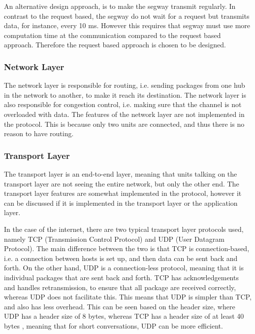 An alternative design approach, is to make the segway transmit regularly. In contrast to the request based, the segway do not wait for a request but transmits data, for instance, every 10 ms. However this  requires that segway must use more computation time at the communication compared to the request based approach. Therefore the request based approach is chosen to be designed.

\subsubsection*{Network Layer}
The network layer is responsible for routing, i.e. sending packages from one hub in the network to another, to make it reach its destination. The network layer is also responsible for congestion control, i.e. making sure that the channel is not overloaded with data.
The features of the network layer are not implemented in the protocol. This is because only two units are connected, and thus there is no reason to have routing.

\subsubsection*{Transport Layer}
The transport layer is an end-to-end layer, meaning that units talking on the transport layer are not seeing the entire network, but only the other end. The transport layer features are somewhat implemented in the protocol, however it can be discussed if it is implemented in the transport layer or the application layer. 

In the case of the internet, there are two typical transport layer protocols used, namely TCP (Transmission Control Protocol) and UDP (User Datagram Protocol). The main difference between the two is that TCP is connection-based, i.e. a connection between hosts is set up, and then data can be sent back and forth. On the other hand, UDP is a connection-less protocol, meaning that it is individual packages that are sent back and forth.
TCP has acknowledgements and handles retransmission, to ensure that all package are received correctly, whereas UDP does not facilitate this. This means that UDP is simpler than TCP, and also has less overhead. This can be seen based on the header size, where UDP has a header size of 8 bytes, whereas TCP has a header size of at least 40 bytes \citep{tanenbaum}, meaning that for short conversations, UDP can be more efficient.

